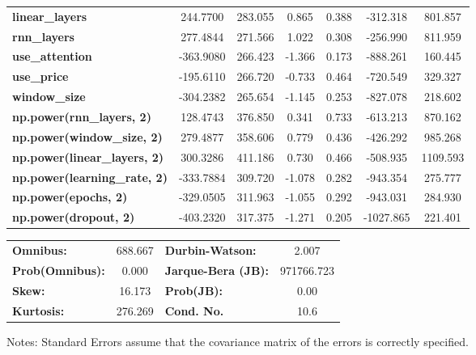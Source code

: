 \begin{center}
\begin{tabular}{lcccccc}
\textbf{linear\_layers}              &     244.7700  &      283.055     &     0.865  &         0.388        &     -312.318    &      801.857     \\
\textbf{rnn\_layers}                 &     277.4844  &      271.566     &     1.022  &         0.308        &     -256.990    &      811.959     \\
\textbf{use\_attention}              &    -363.9080  &      266.423     &    -1.366  &         0.173        &     -888.261    &      160.445     \\
\textbf{use\_price}                  &    -195.6110  &      266.720     &    -0.733  &         0.464        &     -720.549    &      329.327     \\
\textbf{window\_size}                &    -304.2382  &      265.654     &    -1.145  &         0.253        &     -827.078    &      218.602     \\
\textbf{np.power(rnn\_layers, 2)}    &     128.4743  &      376.850     &     0.341  &         0.733        &     -613.213    &      870.162     \\
\textbf{np.power(window\_size, 2)}   &     279.4877  &      358.606     &     0.779  &         0.436        &     -426.292    &      985.268     \\
\textbf{np.power(linear\_layers, 2)} &     300.3286  &      411.186     &     0.730  &         0.466        &     -508.935    &     1109.593     \\
\textbf{np.power(learning\_rate, 2)} &    -333.7884  &      309.720     &    -1.078  &         0.282        &     -943.354    &      275.777     \\
\textbf{np.power(epochs, 2)}         &    -329.0505  &      311.963     &    -1.055  &         0.292        &     -943.031    &      284.930     \\
\textbf{np.power(dropout, 2)}        &    -403.2320  &      317.375     &    -1.271  &         0.205        &    -1027.865    &      221.401     \\
\bottomrule
\end{tabular}
\begin{tabular}{lclc}
\textbf{Omnibus:}       & 688.667 & \textbf{  Durbin-Watson:     } &     2.007   \\
\textbf{Prob(Omnibus):} &   0.000 & \textbf{  Jarque-Bera (JB):  } & 971766.723  \\
\textbf{Skew:}          &  16.173 & \textbf{  Prob(JB):          } &      0.00   \\
\textbf{Kurtosis:}      & 276.269 & \textbf{  Cond. No.          } &      10.6   \\
\bottomrule
\end{tabular}
\end{center}

Notes: \newline
 [1] Standard Errors assume that the covariance matrix of the errors is correctly specified.